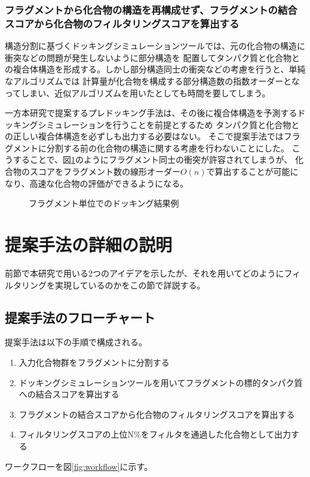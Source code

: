\subsubsection{フラグメントから化合物の構造を再構成せず、フラグメントの結合スコアから化合物のフィルタリングスコアを算出する}
構造分割に基づくドッキングシミュレーションツールでは、元の化合物の構造に衝突などの問題が発生しないように部分構造を
配置してタンパク質と化合物との複合体構造を形成する。しかし部分構造同士の衝突などの考慮を行うと、単純なアルゴリズムでは
計算量が化合物を構成する部分構造数の指数オーダーとなってしまい、近似アルゴリズムを用いたとしても時間を要してしまう。

一方本研究で提案するプレドッキング手法は、その後に複合体構造を予測するドッキングシミュレーションを行うことを前提とするため
タンパク質と化合物との正しい複合体構造を必ずしも出力する必要はない。
そこで提案手法ではフラグメントに分割する前の化合物の構造に関する考慮を行わないことにした。
こうすることで、図\ref{fig:divided_fragment}のようにフラグメント同士の衝突が許容されてしまうが、
化合物のスコアをフラグメント数の線形オーダー$O(n)$で算出することが可能になり、高速な化合物の評価ができるようになる。

\begin{figure}[t]
 \begin{center}
  \caption{フラグメント単位でのドッキング結果例}
  \label{fig:divided_fragment}
 \end{center}
\end{figure}



\section{提案手法の詳細の説明}
前節で本研究で用いる2つのアイデアを示したが、それを用いてどのようにフィルタリングを実現しているのかをこの節で詳説する。

\subsection{提案手法のフローチャート}\label{subsec:flowchart}
提案手法は以下の手順で構成される。
\begin{enumerate}
\item 入力化合物群をフラグメントに分割する
\item ドッキングシミュレーションツールを用いてフラグメントの標的タンパク質への結合スコアを算出する
\item フラグメントの結合スコアから化合物のフィルタリングスコアを算出する
\item フィルタリングスコアの上位N\%をフィルタを通過した化合物として出力する
\end{enumerate}
ワークフローを図\ref{fig:workflow}に示す。

